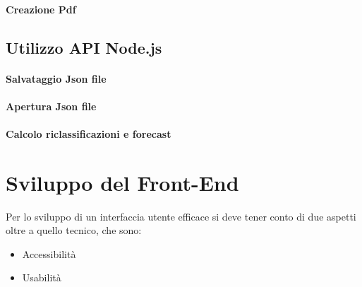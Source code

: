 \paragraph {Creazione Pdf}


\subsection{Utilizzo API Node.js}


\paragraph {Salvataggio Json file}


\paragraph {Apertura Json file}


\paragraph {Calcolo riclassificazioni e forecast}



\newpage

\section{Sviluppo del Front-End}

Per lo sviluppo di un interfaccia utente efficace si deve tener conto di due aspetti oltre a quello tecnico, che sono:
\begin{itemize}
\item Accessibilità
\item Usabilità
\end{itemize}

